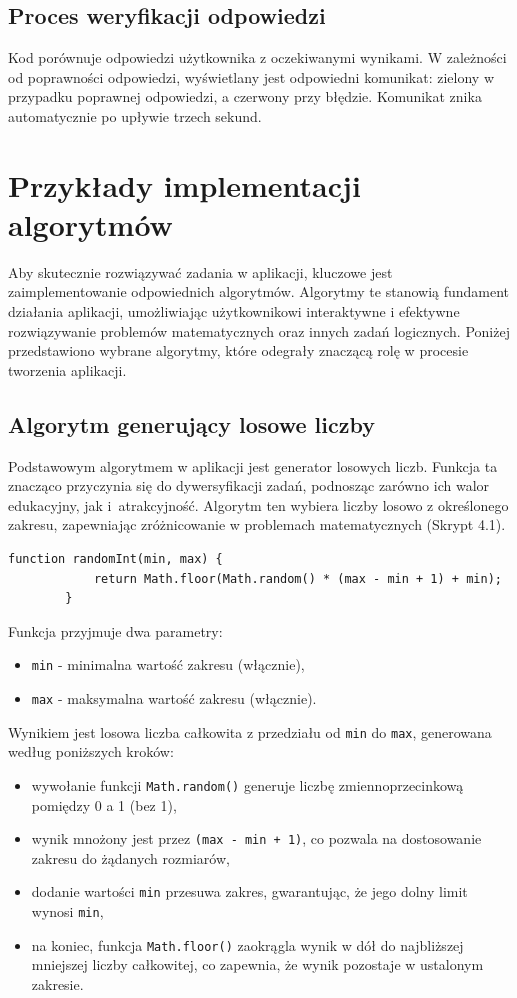 \documentclass{SGGW-thesis}
\begin{document}
	\subsection{Proces weryfikacji odpowiedzi}
	Kod porównuje odpowiedzi użytkownika z oczekiwanymi wynikami. W zależności od poprawności odpowiedzi, wyświetlany jest odpowiedni komunikat: zielony w przypadku poprawnej odpowiedzi, a czerwony przy błędzie. Komunikat znika automatycznie po upływie trzech sekund.
	\newpage
	
	\section{Przykłady implementacji algorytmów}
	Aby skutecznie rozwiązywać zadania w aplikacji, kluczowe jest zaimplementowanie odpowiednich algorytmów. Algorytmy te stanowią fundament działania aplikacji, umożliwiając użytkownikowi interaktywne i efektywne rozwiązywanie problemów matematycznych oraz innych zadań logicznych.
	Poniżej przedstawiono wybrane algorytmy, które odegrały znaczącą rolę w procesie tworzenia aplikacji.
	
	\subsection{Algorytm generujący losowe liczby}
	Podstawowym algorytmem w aplikacji jest generator losowych liczb. Funkcja ta znacząco przyczynia się do dywersyfikacji zadań, podnosząc zarówno ich walor edukacyjny, jak i~atrakcyjność. Algorytm ten wybiera liczby losowo z określonego zakresu, zapewniając zróżnicowanie w problemach matematycznych (Skrypt 4.1).
	\vspace{1em}
	\begin{lstlisting}[caption=Funkcja generująca losowe liczby w JavaScript]
		function randomInt(min, max) {
			return Math.floor(Math.random() * (max - min + 1) + min);
		}
	\end{lstlisting}
	\vspace{1em}
	Funkcja przyjmuje dwa parametry:
	\begin{itemize}
		\item \texttt{min} - minimalna wartość zakresu (włącznie),
		\item \texttt{max} - maksymalna wartość zakresu (włącznie).
	\end{itemize}
	Wynikiem jest losowa liczba całkowita z przedziału od \texttt{min} do \texttt{max}, generowana według poniższych kroków:
	\begin{itemize}
		\item wywołanie funkcji \texttt{Math.random()} generuje liczbę zmiennoprzecinkową pomiędzy 0 a 1 (bez 1),
		\item wynik mnożony jest przez \texttt{(max - min + 1)}, co pozwala na dostosowanie zakresu do żądanych rozmiarów,
		\item dodanie wartości \texttt{min} przesuwa zakres, gwarantując, że jego dolny limit wynosi \texttt{min},
		\item na koniec, funkcja \texttt{Math.floor()} zaokrągla wynik w dół do najbliższej mniejszej liczby całkowitej, co zapewnia, że wynik pozostaje w ustalonym zakresie.
	\end{itemize}
	\newpage
	
\end{document}
